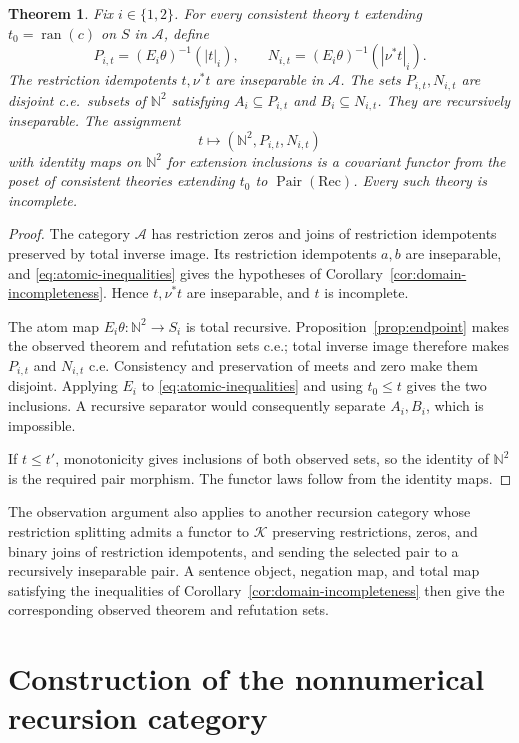 \documentclass[11pt]{article}
\newtheorem{theorem}{Theorem}[section]
\newcommand{\N}{\mathbb N}
\newcommand{\ran}{\operatorname{ran}}
\begin{document}
\begin{theorem}\label{thm:cosheaf-observation}
Fix $i\in\{1,2\}$. For every consistent theory $t$ extending
$t_0=\ran(c)$ on $S$ in $\mathcal A$, define
\[
 P_{i,t}=(E_i\theta)^{-1}(|t|_i),\qquad
 N_{i,t}=(E_i\theta)^{-1}(|\nu^*t|_i).
\]
The restriction idempotents $t,\nu^*t$ are inseparable in $\mathcal A$.
The sets $P_{i,t},N_{i,t}$ are disjoint c.e.\ subsets of $\N^2$ satisfying
$A_i\subseteq P_{i,t}$ and $B_i\subseteq N_{i,t}$.
They are recursively inseparable. The assignment
\[
 t\longmapsto(\N^2,P_{i,t},N_{i,t})
\]
with identity maps on $\N^2$ for extension inclusions is a
covariant functor from the poset of consistent theories extending
$t_0$ to $\operatorname{Pair}(\mathrm{Rec})$.
Every such theory is incomplete.
\end{theorem}
\begin{proof}
The category $\mathcal A$ has restriction zeros and joins of restriction idempotents
preserved by total inverse image. Its restriction idempotents $a,b$ are inseparable,
and \eqref{eq:atomic-inequalities} gives the hypotheses of
Corollary~\ref{cor:domain-incompleteness}. Hence $t,\nu^*t$ are
inseparable, and $t$ is incomplete.

The atom map $E_i\theta:\N^2\to S_i$ is total recursive.
Proposition~\ref{prop:endpoint} makes the observed theorem and refutation
sets c.e.; total inverse image therefore makes $P_{i,t}$
and $N_{i,t}$ c.e. Consistency and preservation of meets and
zero make them disjoint. Applying $E_i$ to
\eqref{eq:atomic-inequalities} and using $t_0\le t$ gives
the two inclusions. A recursive separator would consequently
separate $A_i,B_i$, which is impossible.

If $t\le t'$, monotonicity gives inclusions of both observed
sets, so the identity of $\N^2$ is the required pair morphism.
The functor laws follow from the identity maps.
\end{proof}

The observation argument also applies to another recursion category
whose restriction splitting admits a functor to $\mathcal K$
preserving restrictions, zeros, and binary joins of restriction
idempotents, and sending the selected pair to a recursively inseparable pair. A sentence object,
negation map, and total map satisfying the inequalities of
Corollary~\ref{cor:domain-incompleteness} then give the corresponding
observed theorem and refutation sets.

\appendix

\section{Construction of the nonnumerical recursion category}\label{app:fork-structure}
\end{document}
